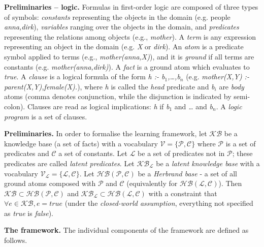 \textbf{Preliminaries -- logic.}
Formulas in first-order logic are composed of three types of symbols: \textit{constants} representing the objects in the domain (e.g. people \textit{anna,dirk}), \textit{variables} ranging over the objects in the domain, and \textit{predicates} representing the relations among objects (e.g., \textit{mother}).
A \textit{term} is any expression representing an object in the domain (e.g. \textit{X} or \textit{dirk}).
An \textit{atom} is a predicate symbol applied to terms (e.g., \textit{mother(anna,X)}), and it is \textit{ground} if all terms are constants (e.g. \textit{mother(anna,dirk)}).
A \textit{fact} is a ground atom which evaluates to \textit{true}.
A \textit{clause} is a logical formula of the form \textit{h :- b$_1$,\ldots,b$_n$} (e.g. \textit{mother(X,Y) :- parent(X,Y),female(X).}), where \textit{h} is called the \textit{head} predicate and \textit{b$_i$} are \textit{body} atoms (comma denotes conjunction, while the disjunction is indicated by semi-colon).
Clauses are read as logical implications: \textit{h} if \textit{b$_1$} and \textit{\ldots} and \textit{b$_n$}.
A \textit{logic program} is a set of clauses.



\textbf{Preliminaries.} 
In order to formalise the learning framework, let $\mathcal{KB}$ be a knowledge base (a set of facts) with a vocabulary $\mathcal{V} = \{ \mathcal{P}, \mathcal{C}\}$ where $\mathcal{P}$ is a set of predicates and $\mathcal{C}$ a set of constants.
Let $\mathcal{L}$ be a set of predicates not in $\mathcal{P}$; these predicates are called \textit{latent predicates}.
Let $\mathcal{KB}_{\mathcal{L}}$ be a \textit{latent knowledge base} with a vocabulary $\mathcal{V}_{\mathcal{L}} = \{\mathcal{L}, \mathcal{C}\}$.
Let $\mathcal{HB(P,C)}$ be a \textit{Herbrand base} - a set of all ground atoms composed with $\mathcal{P}$ and $\mathcal{C}$ (equivalently for $\mathcal{HB(L,C)}$).
Then $\mathcal{KB} \subset \mathcal{HB(P,C)}$ and $\mathcal{KB}_{\mathcal{L}} \subset \mathcal{HB(L,C)}$ with a constraint that $\forall e \in \mathcal{KB}, e = true$ (under the \textit{closed-world assumption}, everything not specified as \textit{true} is \textit{false}).



\textbf{The framework.} 
The individual components of the framework are defined as follows.



